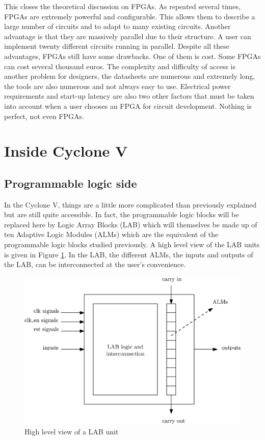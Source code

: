 This closes the theoretical discussion on FPGAs. As repeated several times, FPGAs are extremely 
powerful and configurable. This allows them to describe a large number of circuits and to adapt to
many existing circuits. Another advantage is that they are massively parallel due to their 
structure. A user can implement twenty different circuits running in parallel. Despite all these 
advantages, FPGAs still have some drawbacks. One of them is cost. Some FPGAs can cost several 
thousand euros. The complexity and difficulty of access is another problem for designers, the 
datasheets are numerous and extremely long, the tools are also numerous and not always easy to use. 
Electrical power requirements and start-up latency are also two other factors that must be taken 
into account when a user chooses an FPGA for circuit development. Nothing is perfect, not even 
FPGAs.

\section{Inside Cyclone V}

\subsection{Programmable logic side}

In the Cyclone V, things are a little more complicated than previously explained but are still quite 
accessible. In fact, the programmable logic blocks will be replaced here by Logic Array Blocks (LAB) 
which will themselves be made up of ten Adaptive Logic Modules (ALMs) which are the equivalent of 
the programmable logic blocks studied previously. A high level view of the LAB units is given in
Figure \ref{fig:cyc5/lab}. In the LAB, the different ALMs, the inputs and outputs of the LAB, can be 
interconnected at the user's convenience.

\begin{figure}[H]
    \centering
    \includegraphics[scale=0.8]{Chapter1-Hardware/res/lab_block.eps}
    \caption{High level view of a LAB unit}
    \label{fig:cyc5/lab}
\end{figure}

